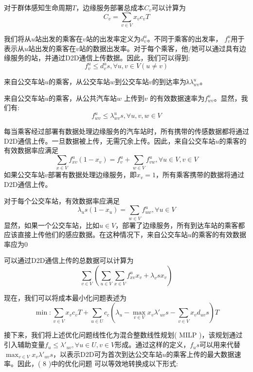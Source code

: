 对于群体感知生命周期$T$，边缘服务部署总成本$C_v$可以计算为
\begin{equation}
C_v = \sum_{v\in V}x_v c_v T
\end{equation}

我们将从$u$站出发的乘客在$v$站的出发率定义为$d^u_v$。不同于乘客的出发率， $f^u_v$用于表示从$u$站出发的乘客在$v$站的数据出发率。对于每个乘客，他/她可以通过具有边缘服务的站，并通过D2D通信上传数据。因此，我们可以得到:
\begin{equation}
f^u_v \leq d^u_v s, \forall u, v\in V (u \neq v)
\end{equation}

来自公交车站$u$的乘客，从公交车站$w$到公交车站$v$的到达率为λ$\lambda^u_{wv}$。

来自公交车站$u$的乘客，从公共汽车站$w$ 上传到$v$ 的有效数据速率为$f^u_{wv}$。显然，我们有:
\begin{equation}
	f^u_{wv} \leq \lambda^u_{wv} s, \forall u, v, w \in V
\end{equation}

每当乘客经过部署有数据处理边缘服务的汽车站时，所有携带的传感数据都将通过D2D通信上传。一旦数据被上传，无需冗余上传。因此，来自公交车站$u$的乘客的有效数据率应满足
\begin{equation}
    \sum_{x\in V}f^u_{xv} (1-x_v) = f^u_v + \sum_{w\in V}f^u_{vw}, \forall u\in V, v\in V
\end{equation}
如果公交车站$v$部署有数据处理边缘服务，即$x_v = 1$，所有乘客携带的数据将通过D2D通信上传。 

对于每个公交车站，有效数据率应满足
\begin{equation}
	\lambda_u s (1 - x_u) = \sum_{w\in V}f^u_{uw}, \forall u\in V
\end{equation}
显然，如果一个公交车站，比如$u\in V$，部署了边缘服务，所有到达车站的乘客都应该直接上传他们的感应数据。在这种情况下，来自公交车站$u$的乘客的有效数据率应为0

可以通过D2D通信上传的总数据可以计算为
\begin{equation}
	\sum_{v\in V}(\sum_{u\in V}\sum_{x\in V}f^u_{xv} x_v + \lambda_v s x_v)
\end{equation}

现在，我们可以将成本最小化问题表述为
\begin{equation}
\min: \sum_{v\in V}x_v c_vT+\sum_{u\in U}c_c(\lambda_u - \max_{v\in V} x_v \lambda'_{uv} s - \sum_{v\in V}x_v d_{uv} s)T
\label{eq:origin_opt}
\end{equation}

接下来，我们将上述优化问题线性化为混合整数线性规划( MILP )，该规划通过引入辅助变量$f_{u} \leq \lambda'_{uv}, \forall u\in U, v\in V$形成。通过这样的定义，$f_u s$可以用来代替$\max_{v\in V} x_v \lambda'_{uv} s$，以表示D2D可为首次到达公交车站$u$的乘客上传的最大数据速率。因此，( 8 )中的优化问题 可以等效地转换成以下形式:

